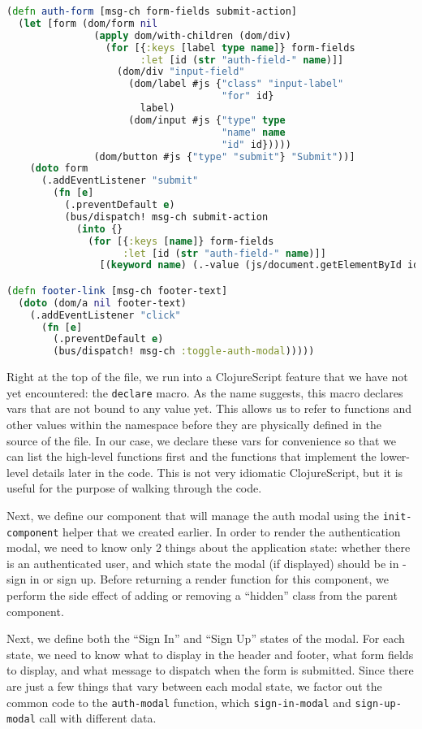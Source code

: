 \documentclass[10pt,twoside,openright]{memoir}
\begin{document}
\begin{lstlisting}[language=Clojure, caption={chat/components/auth.cljs}]
(defn auth-form [msg-ch form-fields submit-action]
  (let [form (dom/form nil
               (apply dom/with-children (dom/div)
                 (for [{:keys [label type name]} form-fields
                       :let [id (str "auth-field-" name)]]
                   (dom/div "input-field"
                     (dom/label #js {"class" "input-label"
                                     "for" id}
                       label)
                     (dom/input #js {"type" type
                                     "name" name
                                     "id" id}))))
               (dom/button #js {"type" "submit"} "Submit"))]
    (doto form
      (.addEventListener "submit"
        (fn [e]
          (.preventDefault e)
          (bus/dispatch! msg-ch submit-action
            (into {}
              (for [{:keys [name]} form-fields
                    :let [id (str "auth-field-" name)]]
                [(keyword name) (.-value (js/document.getElementById id))]))))))))

(defn footer-link [msg-ch footer-text]
  (doto (dom/a nil footer-text)
    (.addEventListener "click"
      (fn [e]
        (.preventDefault e)
        (bus/dispatch! msg-ch :toggle-auth-modal)))))
\end{lstlisting}

Right at the top of the file, we run into a ClojureScript feature that
we have not yet encountered: the \texttt{declare} macro. As the name
suggests, this macro declares vars that are not bound to any value yet.
This allows us to refer to functions and other values within the
namespace before they are physically defined in the source of the file.
In our case, we declare these vars for convenience so that we can list
the high-level functions first and the functions that implement the
lower-level details later in the code. This is not very idiomatic
ClojureScript, but it is useful for the purpose of walking through the
code.

Next, we define our component that will manage the auth modal using the
\texttt{init-component} helper that we created earlier. In order to
render the authentication modal, we need to know only 2 things about the
application state: whether there is an authenticated user, and which
state the modal (if displayed) should be in - sign in or sign up. Before
returning a render function for this component, we perform the side
effect of adding or removing a ``hidden'' class from the parent
component.

Next, we define both the ``Sign In'' and ``Sign Up'' states of the
modal. For each state, we need to know what to display in the header and
footer, what form fields to display, and what message to dispatch when
the form is submitted. Since there are just a few things that vary
between each modal state, we factor out the common code to the
\texttt{auth-modal} function, which \texttt{sign-in-modal} and
\texttt{sign-up-modal} call with different data.
\end{document}
